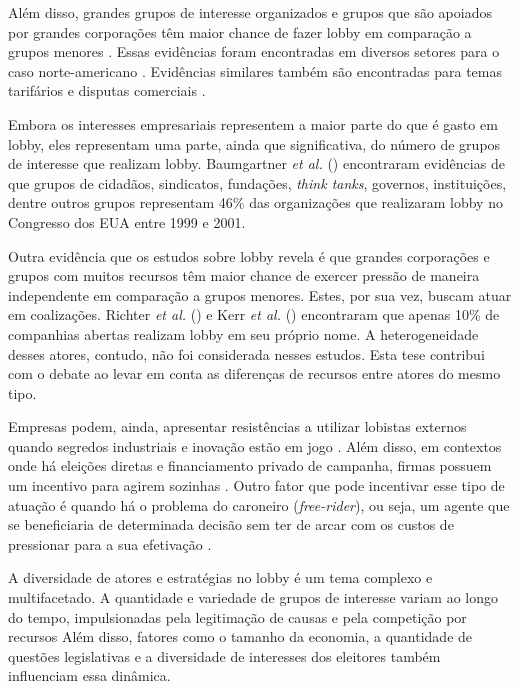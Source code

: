 Além disso, grandes grupos de interesse organizados e grupos que são apoiados por grandes corporações têm maior chance de fazer lobby em comparação a grupos menores \cite{de_figueiredo_advancing_2014}. Essas evidências foram encontradas em diversos setores para o caso norte-americano \cite{ansolabehere2003why, hansen2004collective, guo2009lobby, hochberg2009lobbying, richter2009lobbying, hill2013determinants}. Evidências similares também são encontradas para temas tarifários e disputas comerciais \cite{bombardini2012competition}.

Embora os interesses empresariais representem a maior parte do que é gasto em lobby, eles representam uma parte, ainda que significativa, do número de grupos de interesse que realizam lobby. Baumgartner \textit{et al.} (\citeyear{baumgartner2009lobbying}) encontraram evidências de que grupos de cidadãos, sindicatos, fundações, \textit{think tanks}, governos, instituições, dentre outros grupos representam 46\% das organizações que realizaram lobby no Congresso dos EUA entre 1999 e 2001.

Outra evidência que os estudos sobre lobby revela é que grandes corporações e grupos com muitos recursos têm maior chance de exercer pressão de maneira independente em comparação a grupos menores. Estes, por sua vez, buscam atuar em coalizações. Richter \textit{et al.} (\citeyear{richter2011good}) e Kerr \textit{et al.} (\citeyear{kerr2014dynamics}) encontraram que apenas 10\% de companhias abertas realizam lobby em seu próprio nome. A heterogeneidade desses atores, contudo, não foi considerada nesses estudos. Esta tese contribui com o debate ao levar em conta as diferenças de recursos entre atores do mesmo tipo.

Empresas podem, ainda, apresentar resistências a utilizar lobistas externos quando segredos industriais e inovação estão em jogo \cite{de2001structure}. Além disso, em contextos onde há eleições diretas e financiamento privado de campanha, firmas possuem um incentivo para agirem sozinhas \cite{mahoney_lobbying_2007}. Outro fator que pode incentivar esse tipo de atuação é quando há o problema do caroneiro (\textit{free-rider}), ou seja, um agente que se beneficiaria de determinada decisão sem ter de arcar com os custos de pressionar para a sua efetivação \cite{bombardini2012competition}.

A diversidade de atores e estratégias no lobby é um tema complexo e multifacetado. A quantidade e variedade de grupos de interesse variam ao longo do tempo, impulsionadas pela legitimação de causas e pela competição por recursos \cite{lowery2007organized} Além disso, fatores como o tamanho da economia, a quantidade de questões legislativas \cite{baumgartner2009lobbying, lowery_lobbying_2013} e a diversidade de interesses dos eleitores \cite{berkman2001legislative} também influenciam essa dinâmica.

